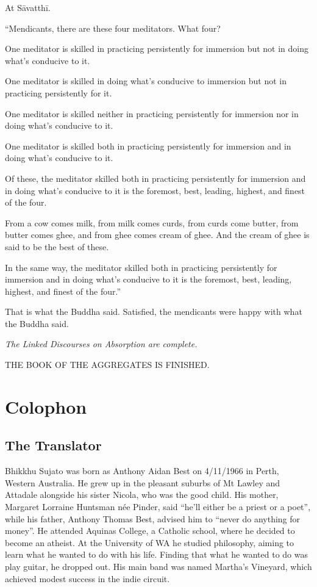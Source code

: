 \documentclass[12pt,openany]{book}%
\newcommand*{\scendsutta}[1]{\begin{center}\textit{#1}\end{center}}
\newcommand*{\scendbook}[1]{\begin{center}\uppercase{#1}\end{center}}
\let\oldbackmatter\backmatter
\renewcommand{\backmatter}{%
\chapterfont{\setstretch{.85}\normalfont\centering}%
\sectionfont{\setstretch{.85}\Semiboldsubheadfont}%
\oldbackmatter}
\begin{document}
At \textsanskrit{Sāvatthī}. 

“Mendicants, there are these four meditators. What four? 

One meditator is skilled in practicing persistently for immersion but not in doing what’s conducive to it. 

One meditator is skilled in doing what’s conducive to immersion but not in practicing persistently for it. 

One meditator is skilled neither in practicing persistently for immersion nor in doing what’s conducive to it. 

One meditator is skilled both in practicing persistently for immersion and in doing what’s conducive to it. 

Of these, the meditator skilled both in practicing persistently for immersion and in doing what’s conducive to it is the foremost, best, leading, highest, and finest of the four. 

From a cow comes milk, from milk comes curds, from curds come butter, from butter comes ghee, and from ghee comes cream of ghee. And the cream of ghee is said to be the best of these. 

In the same way, the meditator skilled both in practicing persistently for immersion and in doing what’s conducive to it is the foremost, best, leading, highest, and finest of the four.” 

That is what the Buddha said. Satisfied, the mendicants were happy with what the Buddha said. 

\scendsutta{The Linked Discourses on Absorption are complete. }

\scendbook{The Book of the Aggregates is finished. }

%
\backmatter%
\chapter*{Colophon}

\section*{The Translator}

Bhikkhu Sujato was born as Anthony Aidan Best on 4/11/1966 in Perth, Western Australia. He grew up in the pleasant suburbs of Mt Lawley and Attadale alongside his sister Nicola, who was the good child. His mother, Margaret Lorraine Huntsman née Pinder, said “he’ll either be a priest or a poet”, while his father, Anthony Thomas Best, advised him to “never do anything for money”. He attended Aquinas College, a Catholic school, where he decided to become an atheist. At the University of WA he studied philosophy, aiming to learn what he wanted to do with his life. Finding that what he wanted to do was play guitar, he dropped out. His main band was named Martha’s Vineyard, which achieved modest success in the indie circuit. 
\end{document}
